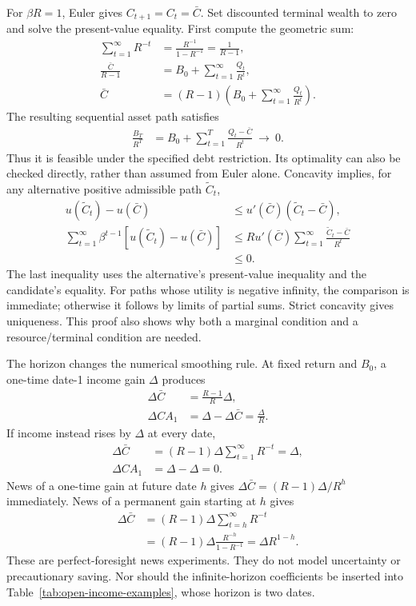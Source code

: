For $\beta R=1$, Euler gives $C_{t+1}=C_t=\bar C$. Set discounted terminal
wealth to zero and solve the present-value equality. First compute the
geometric sum:
\begin{align}
 \sum_{t=1}^\infty R^{-t}
 &=\frac{R^{-1}}{1-R^{-1}}=\frac1{R-1},\\
 \frac{\bar C}{R-1}
 &=B_0+\sum_{t=1}^\infty\frac{Q_t}{R^t},\\
 \bar C&=(R-1)\left(B_0+\sum_{t=1}^\infty\frac{Q_t}{R^t}\right).
 \label{eq:open-annuity}
\end{align}
The resulting sequential asset path satisfies
\begin{align}
 \frac{B_T}{R^T}
 &=B_0+\sum_{t=1}^T\frac{Q_t-\bar C}{R^t}
 \ \longrightarrow\ 0.
\end{align}
Thus it is feasible under the specified debt restriction. Its optimality can
also be checked directly, rather than assumed from Euler alone. Concavity
implies, for any alternative positive admissible path $\tilde C_t$,
\begin{align}
 u(\tilde C_t)-u(\bar C)
 &\leq u'(\bar C)(\tilde C_t-\bar C),\\
 \sum_{t=1}^\infty\beta^{t-1}
 [u(\tilde C_t)-u(\bar C)]
 &\leq R u'(\bar C)\sum_{t=1}^\infty
             \frac{\tilde C_t-\bar C}{R^t}\\
 &\leq0.
\end{align}
The last inequality uses the alternative's present-value inequality and the
candidate's equality. For paths whose utility is negative infinity, the
comparison is immediate; otherwise it follows by limits of partial sums.
Strict concavity gives uniqueness. This proof also shows why both a marginal
condition and a resource/terminal condition are needed.

The horizon changes the numerical smoothing rule. At fixed return and $B_0$,
a one-time date-1 income gain $\Delta$ produces
\begin{align}
 \Delta\bar C&=\frac{R-1}{R}\Delta,\\
 \Delta CA_1&=\Delta-\Delta\bar C=\frac\Delta R.
\end{align}
If income instead rises by $\Delta$ at every date,
\begin{align}
 \Delta\bar C&=(R-1)\Delta\sum_{t=1}^\infty R^{-t}=\Delta,\\
 \Delta CA_1&=\Delta-\Delta=0.
\end{align}
News of a one-time gain at future date $h$ gives
$\Delta\bar C=(R-1)\Delta/R^h$ immediately. News of a permanent gain starting
at $h$ gives
\begin{align}
 \Delta\bar C
 &=(R-1)\Delta\sum_{t=h}^\infty R^{-t}\\
 &=(R-1)\Delta\frac{R^{-h}}{1-R^{-1}}
   =\Delta R^{1-h}.
\end{align}
These are perfect-foresight news experiments. They do not model uncertainty
or precautionary saving. Nor should the infinite-horizon coefficients be
inserted into Table~\ref{tab:open-income-examples}, whose horizon is two dates.

